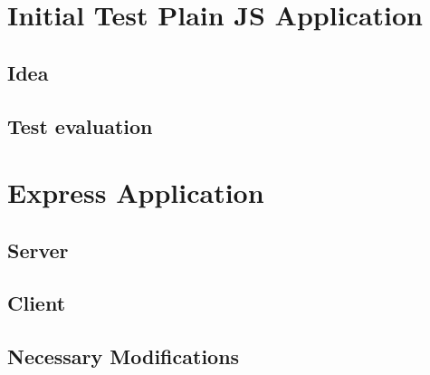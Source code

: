 \section{Initial Test Plain JS Application}
\subsection{Idea}
\subsection{Test evaluation}
\section{Express Application}
\subsection{Server}
\subsection{Client}
\subsection{Necessary Modifications}
